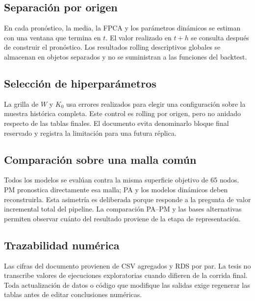\documentclass[a4paper,11pt]{article}
\begin{document}
\subsection{Separación por origen}

En cada pronóstico, la media, la FPCA y los parámetros dinámicos se estiman con una ventana que termina en \(t\). El valor realizado en \(t+h\) se consulta después de construir el pronóstico. Los resultados rolling descriptivos globales se almacenan en objetos separados y no se suministran a las funciones del backtest.

\subsection{Selección de hiperparámetros}

La grilla de \(W\) y \(K_0\) usa errores realizados para elegir una configuración sobre la muestra histórica completa. Este control es rolling por origen, pero no anidado respecto de las tablas finales. El documento evita denominarlo bloque final reservado y registra la limitación para una futura réplica.

\subsection{Comparación sobre una malla común}

Todos los modelos se evalúan contra la misma superficie objetivo de 65 nodos. PM pronostica directamente esa malla; PA y los modelos dinámicos deben reconstruirla. Esta asimetría es deliberada porque responde a la pregunta de valor incremental total del pipeline. La comparación PA--PM y las bases alternativas permiten observar cuánto del resultado proviene de la etapa de representación.

\subsection{Trazabilidad numérica}

Las cifras del documento provienen de CSV agregados y RDS por par. La tesis no transcribe valores de ejecuciones exploratorias cuando difieren de la corrida final. Toda actualización de datos o código que modifique las salidas exige regenerar las tablas antes de editar conclusiones numéricas.
\end{document}
